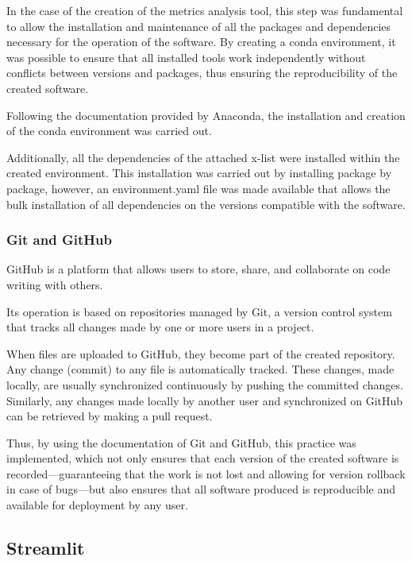 In the case of the creation of the metrics analysis tool, this step was fundamental to allow the installation and maintenance of all the packages and dependencies necessary for the operation of the software. By creating a conda environment, it was possible to ensure that all installed tools work independently without conflicts between versions and packages, thus ensuring the reproducibility of the created software. \cite{anaconda2}

Following the documentation provided by Anaconda, the installation and creation of the conda environment was carried out. \cite{anaconda3} 

Additionally, all the dependencies of the attached x-list were installed within the created environment. This installation was carried out by installing package by package, however, an environment.yaml file was made available that allows the bulk installation \cite{anaconda4} of all dependencies on the versions compatible with the software.

\subsubsection{\textbf{Git and GitHub}}

GitHub is a platform that allows users to store, share, and collaborate on code writing with others. \cite{github}

Its operation is based on repositories managed by Git, a version control system that tracks all changes made by one or more users in a project. \cite{github}

When files are uploaded to GitHub, they become part of the created repository. Any change (commit) to any file is automatically tracked. These changes, made locally, are usually synchronized continuously by pushing the committed changes. Similarly, any changes made locally by another user and synchronized on GitHub can be retrieved by making a pull request. \cite{github}

Thus, by using the documentation of Git and GitHub, this practice was implemented, which not only ensures that each version of the created software is recorded—guaranteeing that the work is not lost and allowing for version rollback in case of bugs—but also ensures that all software produced is reproducible and available for deployment by any user. \cite{github}

\subsection{Streamlit}

